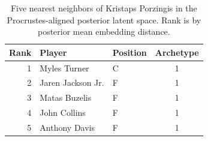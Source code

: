 \begin{table}[htbp]
  \centering\small
  \begin{tabular}{rllc}
    \toprule
    Rank & Player & Position & Archetype \\
    \midrule
    1 & Myles Turner & C & 1 \\
    2 & Jaren Jackson Jr. & F & 1 \\
    3 & Matas Buzelis & F & 1 \\
    4 & John Collins & F & 1 \\
    5 & Anthony Davis & F & 1 \\
    \bottomrule
  \end{tabular}
  \caption{Five nearest neighbors of Kristaps Porzingis in the Procrustes-aligned posterior latent space. Rank is by posterior mean embedding distance.}
  \label{tab:Kristaps_Porzingis_neighbors}
\end{table}

